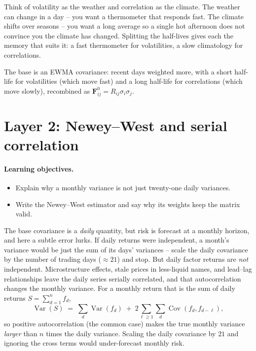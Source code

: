 \documentclass[11pt]{article}
\theoremstyle{definition}
\theoremstyle{plain}
\theoremstyle{remark}
\DeclareMathOperator{\Var}{Var}
\DeclareMathOperator{\Cov}{Cov}
\newcommand{\Fmat}{\mathbf{F}}
\begin{document}
\begin{intuition}
Think of volatility as the weather and correlation as the climate. The weather can change in a day -- you want a thermometer that responds fast. The climate shifts over seasons -- you want a long average so a single hot afternoon does not convince you the climate has changed. Splitting the half-lives gives each the memory that suits it: a fast thermometer for volatilities, a slow climatology for correlations.
\end{intuition}

\begin{keyresult}
The base is an EWMA covariance: recent days weighted more, with a short half-life for volatilities (which move fast) and a long half-life for correlations (which move slowly), recombined as $\Fmat^0_{ij}=R_{ij}\sigma_i\sigma_j$.
\end{keyresult}

\section{Layer 2: Newey--West and serial correlation}\label{sec:nw}

\paragraph{Learning objectives.}
\begin{itemize}[leftmargin=1.4em,topsep=2pt]
  \item Explain why a monthly variance is not just twenty-one daily variances.
  \item Write the Newey--West estimator and say why its weights keep the matrix valid.
\end{itemize}

The base covariance is a \emph{daily} quantity, but risk is forecast at a monthly horizon, and here a subtle error lurks. If daily returns were independent, a month's variance would be just the sum of its days' variances -- scale the daily covariance by the number of trading days ($\approx 21$) and stop. But daily factor returns are \emph{not} independent. Microstructure effects, stale prices in less-liquid names, and lead--lag relationships leave the daily series serially correlated, and that autocorrelation changes the monthly variance. For a monthly return that is the sum of daily returns $S=\sum_{d=1}^{n} f_d$,
\[
\Var(S) \;=\; \sum_{d}\Var(f_d) \;+\; 2\sum_{\ell\ge 1}\sum_d \Cov(f_d, f_{d-\ell}),
\]
so positive autocorrelation (the common case) makes the true monthly variance \emph{larger} than $n$ times the daily variance. Scaling the daily covariance by $21$ and ignoring the cross terms would under-forecast monthly risk.
\end{document}
